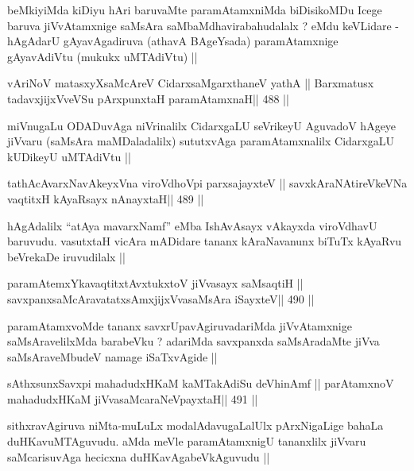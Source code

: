 \begin{artha}
beMkiyiMda kiDiyu hAri baruvaMte paramAtamxniMda biDisikoMDu Icege
baruva jiVvAtamxnige saMsAra saMbaMdhavirabahudalalx ? eMdu keVLidare
- hAgAdarU gAyavAgadiruva (athavA BAgeYsada) paramAtamxnige
gAyavAdiVtu (mukukx uMTAdiVtu) ||
\end{artha}

\begin{shl}
vAriNoV matasxyXsaMcAreV CidarxsaMgarxthaneV yathA ||
Barxmatusx tadavxjijxVveVSu pArxpunxtaH paramAtamxnaH\hfill || 488 ||
\end{shl}

\begin{artha}
miVnugaLu ODADuvAga niVrinalilx CidarxgaLU seVrikeyU AguvadoV hAgeye
jiVvaru (saMsAra maMDaladalilx) sututxvAga paramAtamxnalilx
CidarxgaLU kUDikeyU uMTAdiVtu ||
\end{artha}

\begin{shl}
tathAcAvarxNavAkeyxVna viroVdhoV\s pi parxsajayxteV ||
savxkAraNAtireVkeVNa vaqtitxH kAyaRsayx nAnayxtaH\hfill || 489 ||
\end{shl}

\begin{artha}
hAgAdalilx ``atAya mavarxNamf'' eMba IshAvAsayx vAkayxda viroVdhavU
baruvudu. vasutxtaH vicAra mADidare tananx kAraNavanunx biTuTx kAyaRvu
beVrekaDe iruvudilalx ||
\end{artha}

\begin{shl}
paramAtemxYkavaqtitxtAvxtukxtoV jiVvasayx saMsaqtiH ||
savxpanxsaMcAravatatxsAmxjijxVvasaMsAra iSayxteV\hfill || 490 ||
\end{shl}

\begin{artha}
paramAtamxvoMde tananx savxrUpavAgiruvadariMda jiVvAtamxnige
saMsAravelilxMda barabeVku ? adariMda savxpanxda saMsAradaMte jiVva
saMsAraveMbudeV namage iSaTxvAgide ||
\end{artha}

\begin{shl}
sAthxsunxSavxpi mahadudxHKaM kaMTakAdiSu deVhinAmf ||
parAtamxnoV mahadudxHKaM jiVvasaMcaraNeV\s payxtaH\hfill || 491 ||
\end{shl}

\begin{artha}
sithxravAgiruva niMta-muLuLx modalAdavugaLalUlx pArxNigaLige bahaLa
duHKavuMTAguvudu. aMda meVle paramAtamxnigU tananxlilx jiVvaru
saMcarisuvAga hecicxna duHKavAgabeVkAguvudu ||
\end{artha}

